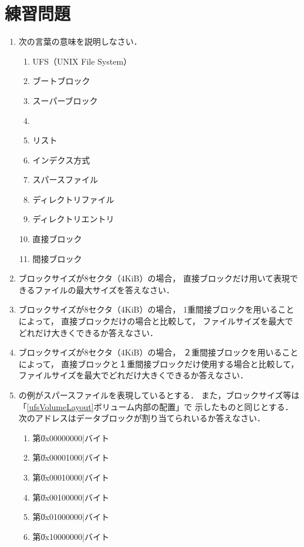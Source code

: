 \section*{練習問題}
\begin{enumerate}
  \renewcommand{\labelenumi}{\ttfamily\arabic{chapter}.\arabic{enumi}}
  \setlength{\leftskip}{1em}
\item 次の言葉の意味を説明しなさい．
  \begin{enumerate}
  \item UFS（UNIX File System）
  \item ブートブロック
  \item スーパーブロック
  \item \inode
  \item \inode リスト
  \item インデクス方式
  \item スパースファイル
  \item ディレクトリファイル
  \item ディレクトリエントリ
  \item 直接ブロック
  \item 間接ブロック
  \end{enumerate}
\item ブロックサイズが8セクタ（4KiB）の場合，
  直接ブロックだけ用いて表現できるファイルの最大サイズを答えなさい．
\item ブロックサイズが8セクタ（4KiB）の場合，
  1重間接ブロックを用いることによって，
  直接ブロックだけの場合と比較して，
  ファイルサイズを最大でどれだけ大きくできるか答えなさい．
\item ブロックサイズが8セクタ（4KiB）の場合，
  ２重間接ブロックを用いることによって，
  直接ブロックと１重間接ブロックだけ使用する場合と比較して，
  ファイルサイズを最大でどれだけ大きくできるか答えなさい．
\item {}の例がスパースファイルを表現しているとする．
  また，ブロックサイズ等は「\ref{ufsVolumeLayout}ボリューム内部の配置」で
  示したものと同じとする．
  次のアドレスはデータブロックが割り当てられいるか答えなさい．
  \begin{enumerate}
    \item 第\|0x00000000|バイト
    \item 第\|0x00001000|バイト
    \item 第\|0x00010000|バイト
    \item 第\|0x00100000|バイト
    \item 第\|0x01000000|バイト
    \item 第\|0x10000000|バイト
  \end{enumerate}
\end{enumerate}
